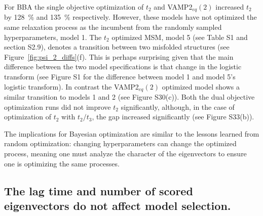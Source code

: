 \documentclass[journal=jacsat,manuscript=article]{achemso}
\begin{document}
For BBA the single objective optimization of $t_2$ and VAMP2$_{eq}(2)$ increased $t_2$ by \SI{128}{\percent} and \SI{135}{\percent} respectively.  However, these models have not optimized the same relaxation process as the incumbent from the randomly sampled hyperparameters, model 1. The $t_2$ optimized MSM, model 5 (see Table S1 and section S2.9), denotes a transition between two misfolded structures (see Figure~\ref{fig:psi_2_diffs}(f).  This is perhaps surprising given that the main difference between the two model specifications is that change in the logistic transform (see Figure S1 for the difference between model 1 and model 5's logistic transform).  In contrast the VAMP2$_{eq}(2)$ optimized model shows a similar transition to models 1 and 2 (see Figure S30(c)).  Both the dual objective optimization runs did not improve $t_2$ significantly, although, in the case of optimization of $t_2$ with $t_2/t_3$, the gap increased significantly (see Figure S33(b)). 

The implications for Bayesian optimization are similar to the lessons learned from random optimization: changing hyperparameters can change the optimized process, meaning one must analyze the character of the eigenvectors to ensure one is optimizing the same processes.  

\FloatBarrier
\clearpage

\subsection{The lag time and number of scored eigenvectors do not affect model selection.}
\end{document}
